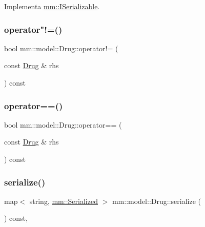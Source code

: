 Implementa \mbox{\hyperlink{classmm_1_1_i_serializable_a9717e6da47fcbac3ffa2e68152464e0a}{mm\+::\+I\+Serializable}}.

\mbox{\label{classmm_1_1model_1_1_drug_a51d9c5692835cab9d206580ccf8d0e1e}} 
\subsubsection{\texorpdfstring{operator"!=()}{operator!=()}}
{\footnotesize\ttfamily bool mm\+::model\+::\+Drug\+::operator!= (\begin{DoxyParamCaption}\item[{const \mbox{\hyperlink{classmm_1_1model_1_1_drug}{Drug}} \&}]{rhs }\end{DoxyParamCaption}) const}

\mbox{\label{classmm_1_1model_1_1_drug_a15151e60eef91b544c63d8ff55db7bab}} 
\subsubsection{\texorpdfstring{operator==()}{operator==()}}
{\footnotesize\ttfamily bool mm\+::model\+::\+Drug\+::operator== (\begin{DoxyParamCaption}\item[{const \mbox{\hyperlink{classmm_1_1model_1_1_drug}{Drug}} \&}]{rhs }\end{DoxyParamCaption}) const}

\mbox{\label{classmm_1_1model_1_1_drug_a5d4fa5bf5e4700f833547c5114764c7b}} 
\subsubsection{\texorpdfstring{serialize()}{serialize()}}
{\footnotesize\ttfamily map$<$ string, \mbox{\hyperlink{structmm_1_1_serialized}{mm\+::\+Serialized}} $>$ mm\+::model\+::\+Drug\+::serialize (\begin{DoxyParamCaption}{ }\end{DoxyParamCaption}) const\hspace{0.3cm}{\ttfamily [override]}, {\ttfamily [virtual]}}



